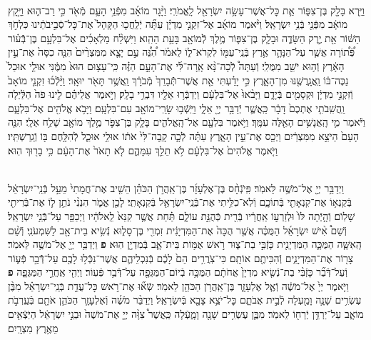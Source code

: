 \documentclass[twoside, openany, parskip=half, 11pt]{book}
\begin{document}
\begin{footnotesize}
\begin{multicols}{2}
\\
וַיַּ֥רְא בָּלָ֖ק בֶּן־צִפּ֑וֹר אֵ֛ת כׇּל־אֲשֶׁר־עָשָׂ֥ה יִשְׂרָאֵ֖ל לָֽאֱמֹרִֽי׃ וַיָּ֨גָר מוֹאָ֜ב מִפְּֿנֵ֥י הָעָ֛ם מְֿאֹ֖ד כִּ֣י רַב־ה֑וּא וַיָּ֣קָץ מוֹאָ֔ב מִפְּֿנֵ֖י בְּֿנֵ֥י יִשְׂרָאֵֽל׃ וַיֹּ֨אמֶר מוֹאָ֜ב אֶל־זִקְנֵ֣י מִדְיָ֗ן עַתָּ֞ה יְֿלַֽחֲכ֤וּ הַקָּהָל֙ אֶת־כׇּל־סְֿבִ֣יבֹתֵ֔ינוּ כִּלְחֹ֣ךְ הַשּׁ֔וֹר אֵ֖ת יֶ֣רֶק הַשָּׂדֶ֑ה וּבָלָ֧ק בֶּן־צִפּ֛וֹר מֶ֥לֶךְ לְֿמוֹאָ֖ב בָּעֵ֥ת הַהִֽוא׃  וַיִּשְׁלַ֨ח מַלְאָכִ֜ים אֶל־בִּלְעָ֣ם בֶּן־בְּֿֿע֗וֹר פְּֿ֠ת֠וֹרָה אֲשֶׁ֧ר עַל־הַנָּהָ֛ר אֶ֥רֶץ בְּֿנֵֽי־עַמּ֖וֹ לִקְרֹא־ל֑וֹ לֵאמֹ֗ר הִ֠נֵּ֠ה עַ֣ם יָצָ֤א מִמִּצְרַ֨יִם֙ הִנֵּ֤ה כִסָּה֙ אֶת־עֵ֣ין הָאָ֔רֶץ וְֿה֥וּא יֹשֵׁ֖ב מִמֻּלִֽי׃ וְֿעַתָּה֩ לְֿכָה־נָּ֨א אָֽרָה־לִּ֜י אֶת־הָעָ֣ם הַזֶּ֗ה כִּֽי־עָצ֥וּם הוּא֙ מִמֶּ֔נִּי אוּלַ֤י אוּכַל֙ נַכֶּה־בּ֔וֹ וַֽאֲגָֽרֲשֶׁ֖נּוּ מִן־הָאָ֑רֶץ כִּ֣י יָדַ֗עְתִּי אֵ֤ת אֲשֶׁר־תְּֿֿבָרֵךְ֙ מְֿבֹרָ֔ךְ וַֽאֲשֶׁ֥ר תָּאֹ֖ר יוּאָֽר׃ וַיֵּ֨לְֿכ֜וּ זִקְנֵ֤י מוֹאָב֙ וְֿזִקְנֵ֣י מִדְיָ֔ן וּקְסָמִ֖ים בְּֿיָדָ֑ם וַיָּבֹ֨אוּ֙ אֶל־בִּלְעָ֔ם וַיְדַבְּֿר֥וּ אֵלָ֖יו דִּבְרֵ֥י בָלָֽק׃  וַיֹּ֣אמֶר אֲלֵיהֶ֗ם לִ֤ינוּ פֹה֙ הַלַּ֔יְלָה וַֽהֲשִֽׁבֹתִ֤י אֶתְכֶם֙ דָּבָ֔ר כַּֽאֲשֶׁ֛ר יְֿדַבֵּ֥ר יְיָ֖ אֵלָ֑י וַיֵּֽשְֿׁב֥וּ שָׂרֵֽי־מוֹאָ֖ב עִם־בִּלְעָֽם׃ וַיָּבֹ֥א אֱלֹהִ֖ים אֶל־בִּלְעָ֑ם וַיֹּ֕אמֶר מִ֛י הָֽאֲנָשִׁ֥ים הָאֵ֖לֶּה עִמָּֽךְ׃ וַיֹּ֥אמֶר בִּלְעָ֖ם אֶל־הָֽאֱלֹהִ֑ים בָּלָ֧ק בֶּן־צִפֹּ֛ר מֶ֥לֶךְ מוֹאָ֖ב שָׁלַ֥ח אֵלָֽי׃ הִנֵּ֤ה הָעָם֙ הַיֹּצֵ֣א מִמִּצְרַ֔יִם וַיְכַ֖ס אֶת־עֵ֣ין הָאָ֑רֶץ עַתָּ֗ה לְֿכָ֤ה קָֽבָה־לִּי֙ אֹת֔וֹ אוּלַ֥י אוּכַ֛ל לְֿהִלָּ֥חֶם בּ֖וֹ וְֿגֵֽרַשְׁתִּֽיו׃ וַיֹּ֤אמֶר אֱלֹהִים֙ אֶל־בִּלְעָ֔ם לֹ֥א תֵלֵ֖ךְ עִמָּהֶ֑ם לֹ֤א תָאֹר֙ אֶת־הָעָ֔ם כִּ֥י בָר֖וּךְ הֽוּא׃

\\
וַיְדַבֵּ֥ר יְיָ֖ אֶל־מֹשֶׁ֥ה לֵּאמֹֽר׃ פִּֽיֹנְֿחָ֨ס בֶּן־אֶלְעָזָ֜ר בֶּן־אַֽהֲרֹ֣ן הַכֹּהֵ֗ן הֵשִׁ֤יב אֶת־חֲמָתִי֙ מֵעַ֣ל בְּֿנֵֽי־יִשְׂרָאֵ֔ל בְּֿקַנְא֥וֹ אֶת־קִנְאָתִ֖י בְּֿתוֹכָ֑ם וְֿלֹֽא־כִלִּ֥יתִי אֶת־בְּֿֿנֵֽי־יִשְׂרָאֵ֖ל בְּֿקִנְאָתִֽי׃ לָכֵ֖ן אֱמֹ֑ר הִנְנִ֨י נֹתֵ֥ן ל֛וֹ אֶת־בְּֿֿרִיתִ֖י שָׁלֽוֹֹם׃  וְֿהָ֤יְֿתָה לּוֹ֙ וּלְזַרְע֣וֹ אַֽחֲרָ֔יו בְּֿרִ֖ית כְּֿהֻנַּ֣ת עוֹלָ֑ם תַּ֗חַת אֲשֶׁ֤ר קִנֵּא֙ לֵֽאלֹהָ֔יו וַיְכַפֵּ֖ר עַל־בְּֿֿנֵ֥י יִשְׂרָאֵֽל׃ וְֿשֵׁם֩ אִ֨ישׁ יִשְׂרָאֵ֜ל הַמֻּכֶּ֗ה אֲשֶׁ֤ר הֻכָּה֙ אֶת־הַמִּדְיָנִ֔ית זִמְרִ֖י בֶּן־סָל֑וּא נְֿשִׂ֥יא בֵית־אָ֖ב לַשִּׁמְעֹנִֽי׃ וְֿשֵׁ֨ם הָֽאִשָּׁ֧ה הַמֻּכָּ֛ה הַמִּדְיָנִ֖ית כָּזְֿבִּ֣י בַת־צ֑וּר רֹ֣אשׁ אֻמּ֥וֹת בֵּית־אָ֛ב בְּֿמִדְיָ֖ן הֽוּא׃ \textbf{פ}
וַיְדַבֵּ֥ר יְיָ֖ אֶל־מֹשֶׁ֥ה לֵּאמֹֽר׃ צָר֖וֹר אֶת־הַמִּדְיָנִ֑ים וְֿהִכִּיתֶ֖ם אוֹתָֽם׃ כִּי־צֹֽרֲרִ֥ים הֵם֙ לָכֶ֔ם בְּֿנִכְלֵיהֶ֛ם אֲשֶׁר־נִכְּֿל֥וּ לָכֶ֖ם עַל־דְּֿֿבַ֣ר פְּֿע֑וֹר וְֿעַל־דְּֿֿבַ֞ר כָּזְֿבִּ֨י בַת־נְֿשִׂ֤יא מִדְיָן֙ אֲחֹתָ֔ם הַמֻּכָּ֥ה בְֿיוֹם־הַמַּגֵּפָ֖ה עַל־דְּֿֿבַ֥ר פְּֿעֽוֹר׃ וַיְהִ֖י אַֽחֲרֵ֣י הַמַּגֵּפָ֑ה \textbf{פ}
וַיֹּ֤אמֶר יְיָ֙ אֶל־מֹשֶׁ֔ה וְֿאֶ֧ל אֶלְעָזָ֛ר בֶּן־אַֽהֲרֹ֥ן הַכֹּהֵ֖ן לֵאמֹֽר׃ שְֿׂא֞וּ אֶת־רֹ֣אשׁ כׇּל־עֲדַ֣ת בְּֿנֵֽי־יִשְׂרָאֵ֗ל מִבֶּ֨ן עֶשְׂרִ֥ים שָׁנָ֛ה וָמַ֖עְלָה לְֿבֵ֣ית אֲבֹתָ֑ם כׇּל־יֹצֵ֥א צָבָ֖א בְּֿיִשְׂרָאֵֽל׃ וַיְדַבֵּ֨ר מֹשֶׁ֜ה וְֿאֶלְעָזָ֧ר הַכֹּהֵ֛ן אֹתָ֖ם בְּֿעַֽרְבֹ֣ת מוֹאָ֑ב עַל־יַרְדֵּ֥ן יְֿרֵח֖וֹ לֵאמֹֽר׃ מִבֶּ֛ן עֶשְׂרִ֥ים שָׁנָ֖ה וָמָ֑עְֿלָה כַּֽאֲשֶׁר֩ צִוָּ֨ה יְיָ֤ אֶת־מֹשֶׁה֙ וּבְנֵ֣י יִשְׂרָאֵ֔ל הַיֹּֽצְֿאִ֖ים מֵאֶ֥רֶץ מִצְרָֽיִם׃



\end{multicols}
\end{footnotesize}
\end{document}
